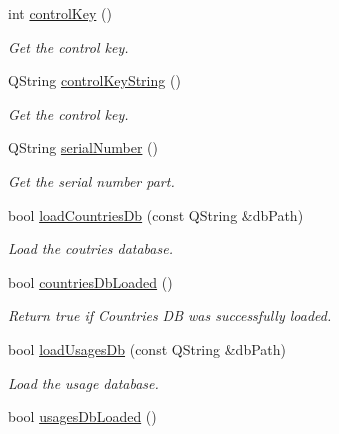 \begin{DoxyCompactItemize}
int \hyperlink{classmdt_uic_number_acd5013109fc4b953023333ac1382edd6}{controlKey} ()
\begin{DoxyCompactList}\small\item\em Get the control key. \end{DoxyCompactList}\item 
QString \hyperlink{classmdt_uic_number_a7a66af4f41cfaf69d53b9db66f465c27}{controlKeyString} ()
\begin{DoxyCompactList}\small\item\em Get the control key. \end{DoxyCompactList}\item 
QString \hyperlink{classmdt_uic_number_ad4fbefb268327d15c2d39d2a17f45180}{serialNumber} ()
\begin{DoxyCompactList}\small\item\em Get the serial number part. \end{DoxyCompactList}\item 
bool \hyperlink{classmdt_uic_number_ad7bb1405db0de8f1d247fa5a7bdb19ce}{loadCountriesDb} (const QString \&dbPath)
\begin{DoxyCompactList}\small\item\em Load the coutries database. \end{DoxyCompactList}\item 
\hypertarget{classmdt_uic_number_a36eec09823de2d9848e9f7b8135fa59d}{
bool \hyperlink{classmdt_uic_number_a36eec09823de2d9848e9f7b8135fa59d}{countriesDbLoaded} ()}
\label{classmdt_uic_number_a36eec09823de2d9848e9f7b8135fa59d}

\begin{DoxyCompactList}\small\item\em Return true if Countries DB was successfully loaded. \end{DoxyCompactList}\item 
bool \hyperlink{classmdt_uic_number_af496e1fb75f696258287754fe2607561}{loadUsagesDb} (const QString \&dbPath)
\begin{DoxyCompactList}\small\item\em Load the usage database. \end{DoxyCompactList}\item 
\hypertarget{classmdt_uic_number_a2090c7d80c75d1db42d271f82ff8f598}{
bool \hyperlink{classmdt_uic_number_a2090c7d80c75d1db42d271f82ff8f598}{usagesDbLoaded} ()}
\label{classmdt_uic_number_a2090c7d80c75d1db42d271f82ff8f598}


\end{DoxyCompactItemize}
